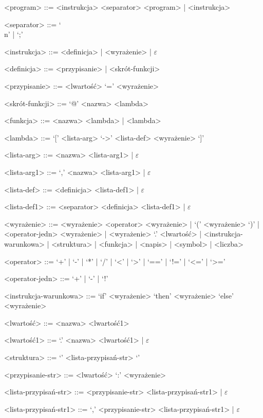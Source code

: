 \documentclass[4paper,10pt]{article}
\begin{document}
\begin{grammar}
<program>       ::= <instrukcja> <separator> <program> | <instrukcja>

<separator>     ::= `\\n' | `;'

<instrukcja>    ::= <definicja> | <wyrażenie> | $\varepsilon$

<definicja>     ::= <przypisanie> | <skrót-funkcji>

<przypisanie>   ::= <lwartość> `=' <wyrażenie>

<skrót-funkcji> ::= `@' <nazwa> <lambda>

\vskip 0.5cm

<funkcja>       ::= <nazwa> <lambda> | <lambda>

<lambda>        ::= `[' <lista-arg> `->' <lista-def> <wyrażenie> `]'

<lista-arg>     ::= <nazwa> <lista-arg1> | $\varepsilon$

<lista-arg1>    ::= `,' <nazwa> <lista-arg1> | $\varepsilon$

<lista-def>     ::= <definicja> <lista-def1> | $\varepsilon$

<lista-def1>    ::= <separator> <definicja> <lista-def1> | $\varepsilon$

\vskip 0.5cm

<wyrażenie>     ::= <wyrażenie> <operator> <wyrażenie> | `(' <wyrażenie> `)' | <operator-jedn> <wyrażenie> | <wyrażenie> `.' <lwartość> | <instrukcja-warunkowa> | <struktura> | <funkcja> | <napis> | <symbol> | <liczba>

<operator>      ::= `+' | `-' | `*' | `/' | `<' | `>' | `==' | `!=' | `<=' | `>='

<operator-jedn> ::= `+' | `-' | `!'

\vskip 0.5cm

<instrukcja-warunkowa> ::= `if' <wyrażenie> `then' <wyrażenie> `else' <wyrażenie>

\vskip 0.5cm

<lwartość>      ::= <nazwa> <lwartość1>

<lwartość1>		::= `.' <nazwa> <lwartość1> | $\varepsilon$

<struktura>              ::= `{' <lista-przypisań-str> `}'

<przypisanie-str>        ::= <lwartość> `:' <wyrażenie>

<lista-przypisań-str>    ::= <przypisanie-str> <lista-przypisań-str1> | $\varepsilon$

<lista-przypisań-str1>   ::= `,' <przypisanie-str> <lista-przypisań-str1> | $\varepsilon$


\end{grammar}
\end{document}
